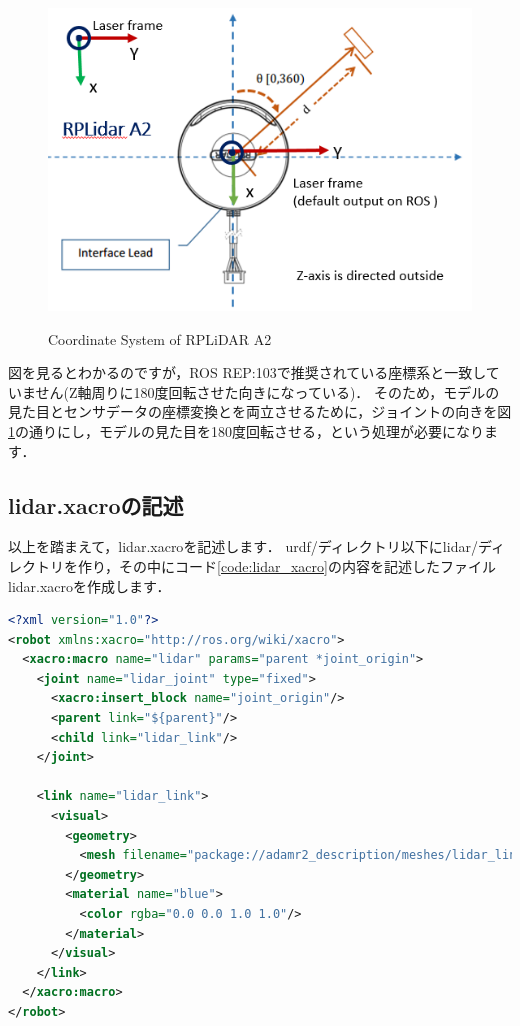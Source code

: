 \documentclass[{../../master}]{subfiles}
\begin{document}
\begin{figure}[ht]
  \centering
  \includegraphics[width=100truemm]{images/rplidar_a2_coordinate_system.png}
  \label{fig:rplidar_a2_coordinate_system}
  \caption{Coordinate System of RPLiDAR A2}
\end{figure}

図を見るとわかるのですが，ROS REP:103で推奨されている座標系と一致していません(Z軸周りに180度回転させた向きになっている)．
そのため，モデルの見た目とセンサデータの座標変換とを両立させるために，ジョイントの向きを図\ref{fig:rplidar_a2_coordinate_system}の通りにし，モデルの見た目を180度回転させる，という処理が必要になります．

\subsection{\textsf{lidar.xacro}の記述}

以上を踏まえて，\textsf{lidar.xacro}を記述します．
\textsf{urdf/}ディレクトリ以下に\textsf{lidar/}ディレクトリを作り，その中にコード\ref{code:lidar_xacro}の内容を記述したファイル\textsf{lidar.xacro}を作成します．

\begin{lstlisting}[language=XML, label=code:lidar_xacro, caption=\textsf{lidar.xacro}]
<?xml version="1.0"?>
<robot xmlns:xacro="http://ros.org/wiki/xacro">
  <xacro:macro name="lidar" params="parent *joint_origin">
    <joint name="lidar_joint" type="fixed">
      <xacro:insert_block name="joint_origin"/>
      <parent link="${parent}"/>
      <child link="lidar_link"/>
    </joint>

    <link name="lidar_link">
      <visual>
        <geometry>
          <mesh filename="package://adamr2_description/meshes/lidar_link.STL"/>
        </geometry>
        <material name="blue">
          <color rgba="0.0 0.0 1.0 1.0"/>
        </material>
      </visual>
    </link>
  </xacro:macro>
</robot>
\end{lstlisting}
\end{document}
